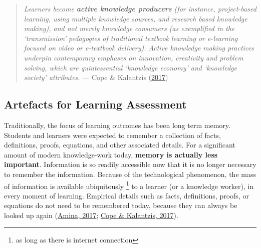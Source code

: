 \documentclass[letterpaper, nobind]{templates/ociamthesis}
\begin{document}
\begin{quote}
\emph{Learners become \textbf{active knowledge producers} (for instance, project-based learning, using multiple knowledge sources, and research based knowledge making), and not merely knowledge consumers (as exemplified in the `transmission' pedagogies of traditional textbook learning or e-learning focused on video or e-textbook delivery). Active knowledge making practices underpin contemporary emphases on innovation, creativity and problem solving, which are quintessential `knowledge economy' and `knowledge society' attributes.}
\hfill --- Cope \& Kalantzis (\protect\hyperlink{ref-cope2017elearningc}{2017})
\end{quote}

\hypertarget{sec-bg-learn-artefact}{%
\subsection{Artefacts for Learning Assessment}\label{sec-bg-learn-artefact}}

Traditionally, the focus of learning outcomes has been long term memory.
Students and learners were expected to remember a collection of facts,
definitions, proofs, equations, and other associated details. For a
significant amount of modern knowledge-work today, \textbf{memory is actually
less important}. Information is so readily accessible now that it is no
longer necessary to remember the information. Because of the
technological phenomenon, the mass of information is available
ubiquitously \footnote{
  as long as there is internet connection} to a learner (or a knowledge worker), in every moment
of learning. Empirical details such as facts, definitions, proofs, or
equations do not need to be remembered today, because they can always be
looked up again (\protect\hyperlink{ref-amina2017active}{Amina, 2017}; \protect\hyperlink{ref-cope2017elearningc}{Cope \& Kalantzis, 2017}).
\end{document}
